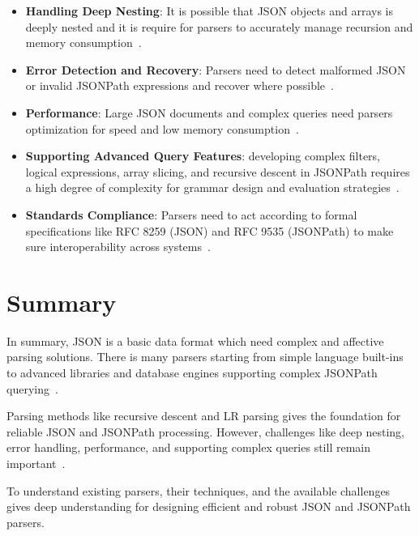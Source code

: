 \begin{itemize}
	\item \textbf{Handling Deep Nesting}: It is possible that JSON objects and arrays is deeply nested and it is require for parsers to accurately manage recursion and memory consumption~\cite{toolsqa_jsonpath}.
	\item \textbf{Error Detection and Recovery}: Parsers need to detect malformed JSON or invalid JSONPath expressions and recover where possible~\cite{jsonpath_com}.
	\item \textbf{Performance}: Large JSON documents and complex queries need parsers optimization for speed and low memory consumption~\cite{programmerall_article}.
	\item \textbf{Supporting Advanced Query Features}: developing complex filters, logical expressions, array slicing, and recursive descent in JSONPath requires a high degree of complexity for grammar design and evaluation strategies~\cite{ietf_jsonpath_draft}.
	\item \textbf{Standards Compliance}: Parsers need to act according to formal specifications like RFC 8259 (JSON) and RFC 9535 (JSONPath) to make sure interoperability across systems~\cite{ietf_rfc9535,ietf_jsonpath_draft}.
\end{itemize}

\section{Summary}

In summary, JSON is a basic data format which need complex and affective parsing solutions. There is many parsers starting from simple language built-ins to advanced libraries and database engines supporting complex JSONPath querying~\cite{brunerd_jsonpath,jsoncons_net,postgres_jsonpath}.

Parsing methods like recursive descent and LR parsing gives the foundation for reliable JSON and JSONPath processing. However, challenges like deep nesting, error handling, performance, and supporting complex queries still remain important~\cite{toolsqa_jsonpath}.

To understand existing parsers, their techniques, and the available challenges gives deep understanding for designing efficient and robust JSON and JSONPath parsers.
